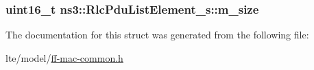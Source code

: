 \subsubsection[{\texorpdfstring{m\+\_\+size}{m_size}}]{\setlength{\rightskip}{0pt plus 5cm}uint16\+\_\+t ns3\+::\+Rlc\+Pdu\+List\+Element\+\_\+s\+::m\+\_\+size}\hypertarget{structns3_1_1RlcPduListElement__s_a29a281dbeb666f293de9a94609bb4383}{}\label{structns3_1_1RlcPduListElement__s_a29a281dbeb666f293de9a94609bb4383}


The documentation for this struct was generated from the following file\+:\begin{DoxyCompactItemize}
\item 
lte/model/\hyperlink{ff-mac-common_8h}{ff-\/mac-\/common.\+h}\end{DoxyCompactItemize}
